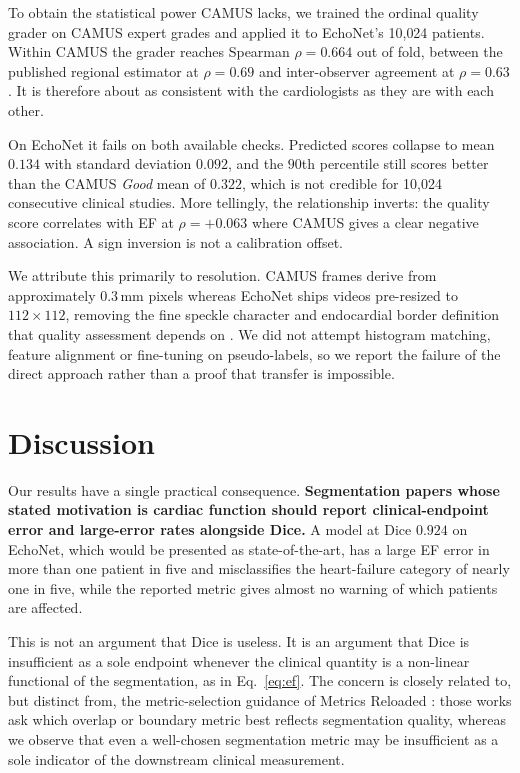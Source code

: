 \documentclass[conference,a4paper]{IEEEtran}
\begin{document}
To obtain the statistical power CAMUS lacks, we trained the ordinal quality grader on CAMUS
expert grades and applied it to EchoNet's 10{,}024 patients. Within CAMUS the grader reaches
Spearman $\rho = 0.664$ out of fold, between the published regional estimator at
$\rho = 0.69$ and inter-observer agreement at $\rho = 0.63$ \cite{rogers2024}. It is
therefore about as consistent with the cardiologists as they are with each other.

On EchoNet it fails on both available checks. Predicted scores collapse to mean $0.134$ with
standard deviation $0.092$, and the $90$th percentile still scores better than the CAMUS
\emph{Good} mean of $0.322$, which is not credible for 10{,}024 consecutive clinical
studies. More tellingly, the relationship inverts: the quality score correlates with EF at
$\rho = +0.063$ where CAMUS gives a clear negative association. A sign inversion is not a
calibration offset.

We attribute this primarily to resolution. CAMUS frames derive from approximately
$0.3$\,mm pixels whereas EchoNet ships videos pre-resized to $112 \times 112$, removing the
fine speckle character and endocardial border definition that quality assessment depends
on \cite{abdi2017,rogers2024}. We did not attempt histogram matching, feature alignment or
fine-tuning on pseudo-labels, so we report the failure of the direct approach rather than a
proof that transfer is impossible.

\section{Discussion}

Our results have a single practical consequence. \textbf{Segmentation papers whose stated
motivation is cardiac function should report clinical-endpoint error and large-error rates
alongside Dice.} A model at Dice $0.924$ on EchoNet, which would be presented as
state-of-the-art, has a large EF error in more than one patient in five and misclassifies
the heart-failure category of nearly one in five, while the reported metric gives almost
no warning of which patients are affected.

This is not an argument that Dice is useless. It is an argument that Dice is insufficient
as a sole endpoint whenever the clinical quantity is a non-linear functional of the
segmentation, as in Eq.~\eqref{eq:ef}. The concern is closely related to, but distinct
from, the metric-selection guidance of Metrics Reloaded \cite{maierhein2024,reinke2024}:
those works ask which overlap or boundary metric best reflects segmentation quality,
whereas we observe that even a well-chosen segmentation metric may be insufficient as a sole
indicator of the downstream clinical measurement.
\end{document}
